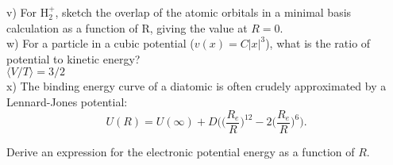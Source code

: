 \documentclass{article}
\begin{document}
\noindent v) For H$_2^+$, sketch the overlap of the atomic orbitals in a minimal basis
calculation as a function of R, giving the value at $R=0$.
\\

\noindent w) For a particle in a cubic potential ($v(x) = C|x|^3$), what is the ratio
of potential to kinetic energy?
\\

{\color{blue} $\langle V/T \rangle = 3/2$}
\\

\noindent x) The binding energy curve of a diatomic is often crudely approximated by a
Lennard-Jones potential:
\begin{equation*}
  U(R) = U(\infty) +D\Bigg(\Bigg(\frac{R_e}{R}\Bigg)^{12} - 2\Bigg(\frac{R_e}{R}\Bigg)^6\Bigg).
\end{equation*}

Derive an expression for the electronic potential energy as a function of $R$.
\end{document}
